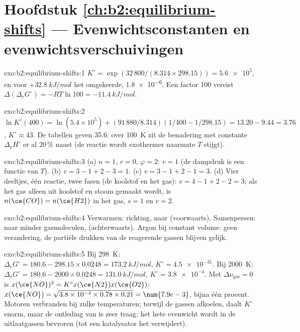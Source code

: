 \section*{Hoofdstuk \ref{ch:b2:equilibrium-shifts} --- Evenwichtsconstanten en evenwichtsverschuivingen}

\begin{solution}{exo:b2:equilibrium-shifts:1}
$K^\circ = \exp(32\,800/(8.314 \times 298.15)) = \num{5.6e5}$, en voor
$+\qty{32.8}{kJ/mol}$ het omgekeerde, \num{1.8e-6}. Een factor 100 vereist
$\Delta(\Delta_r G^\circ) = -RT\ln 100 = \qty{-11.4}{kJ/mol}$.
\end{solution}

\begin{solution}{exo:b2:equilibrium-shifts:2}
$\ln K^\circ(400) = \ln(5.4 \times 10^5) + (91\,880/8.314)(1/400 -
1/298.15) = 13.20 - 9.44 = 3.76$, $K^\circ \approx 43$. De tabellen geven 35.6:
over \qty{100}{K} zit de benadering met constante $\Delta_r H^\circ$ er al
20\,\% naast (de reactie wordt exothermer naarmate $T$ stijgt).
\end{solution}

\begin{solution}{exo:b2:equilibrium-shifts:3}
(a) $n = 1$, $r = 0$, $\varphi = 2$: $v = 1$ (de dampdruk is een functie
van $T$). (b) $v = 3 - 1 + 2 - 3 = 1$. (c) $v = 3 - 1 + 2 - 1 = 3$. (d) Vier
deeltjes, één reactie, twee fasen (de koolstof en het gas): $v = 4 - 1 + 2 - 2 =
3$; als het gas alleen uit koolstof en stoom gemaakt wordt, is $n(\ce{CO}) = n(\ce{H2})$
in het gas, $s = 1$ en $v = 2$.
\end{solution}

\begin{solution}{exo:b2:equilibrium-shifts:4}
Verwarmen:  richting, naar  (voorwaarts). Samenpersen:
naar minder gasmoleculen,  (achterwaarts). Argon bij constant volume:
geen verandering, de partiële drukken van de reagerende gassen blijven gelijk.
\end{solution}

\begin{solution}{exo:b2:equilibrium-shifts:5}
Bij \qty{298}{K}: $\Delta_r G^\circ = 180.6 - 298.15 \times 0.0248 =
\qty{173.2}{kJ/mol}$, $K^\circ = \num{4.5e-31}$. Bij \qty{2000}{K}: $\Delta_r
G^\circ = 180.6 - 2000 \times 0.0248 = \qty{131.0}{kJ/mol}$, $K^\circ =
\num{3.8e-4}$. Met $\Delta\nu_{\text{gas}} = 0$ is $x(\ce{NO})^2 = K^\circ x(\ce{N2})
x(\ce{O2})$: $x(\ce{NO}) = \sqrt{3.8 \times 10^{-4} \times 0.78 \times 0.21} =
\num{7.9e-3}$, bijna één procent. Motoren verbranden bij zulke temperaturen; terwijl de
gassen afkoelen, daalt $K^\circ$ enorm, maar de ontleding van  is
zeer traag: het hete evenwicht wordt in de uitlaatgassen bevroren (tot een katalysator
het verwijdert).
\end{solution}

